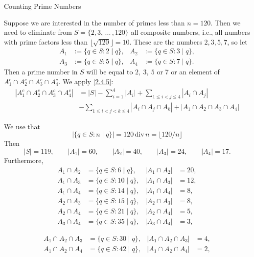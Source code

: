 \documentclass[smaller,hyperref={CJKbookmarks=true}]{beamer}
\begin{document}
\begin{frame}{Counting Prime Numbers}
\begin{spacing}{1.05}
Suppose we are interested in the number of primes less than $n = 120$.
Then we need to eliminate from $S=\{2,3,\,...\,,120\}$ all composite numbers, i.e., all numbers with prime factors less than $\lfloor\sqrt{120}\rfloor=10$. These are the numbers $2,3,5,7$, so let
\begin{align*}
  A_1 &:=\{q\in S:2\mid q\}, & A_2 &:=\{q\in S:3\mid q\}, \\
  A_3 &:=\{q\in S:5\mid q\}, & A_4 &:=\{q\in S:7\mid q\}.
\end{align*}
Then a prime number in $S$ will be equal to $2,\:3,\:5$ or 7 or an element of $A_1^c\cap A_2^c\cap A_3^c\cap A_4^c$. We apply \eqref{2.4.5}:
\begin{equation}\label{2.4.6}
  \begin{split}
     |A_1^c\cap A_2^c\cap A_3^c\cap A_4^c| &=|S|-\sum_{i=1}^{4}|A_i|+\sum_{1\leq i<j\leq 4}|A_i\cap A_j| \\
       &-\sum_{1\leq i<j<k\leq 4}|A_i\cap A_j\cap A_k|+|A_1\cap A_2\cap A_3\cap A_4|
  \end{split}
\end{equation}
\end{spacing}
\newpage
\begin{spacing}{1}
We use that
\[|\{q\in S:n\mid q\}|=120\,\text{div}\,n=\lfloor 120/n\rfloor\]
Then
\[|S|=119,\qquad |A_1|=60,\qquad |A_2|=40,\qquad |A_3|=24,\qquad
|A_4|=17.\]
Furthermore,
\begin{align*}
  A_1\cap A_2 &=\{q\in S:6\mid q\}, & |A_1\cap A_2| &=20, \\
  A_1\cap A_3 &=\{q\in S:10\mid q\}, & |A_1\cap A_3| &=12, \\
  A_1\cap A_4 &=\{q\in S:14\mid q\}, & |A_1\cap A_4| &=8, \\
  A_2\cap A_3 &=\{q\in S:15\mid q\}, & |A_2\cap A_3| &=8, \\
  A_2\cap A_4 &=\{q\in S:21\mid q\}, & |A_2\cap A_4| &=5, \\
  A_3\cap A_4 &=\{q\in S:35\mid q\}, & |A_3\cap A_4| &=3,
\end{align*}
\end{spacing}
\newpage
\begin{spacing}{0.8}
\begin{align*}
  A_1\cap A_2\cap A_3 &=\{q\in S:30\mid q\}, & |A_1\cap A_2\cap A_3| &=4,\\
  A_1\cap A_2\cap A_4 &=\{q\in S:42\mid q\}, & |A_1\cap A_2\cap A_4| &=2,\\

\end{align*}
\end{spacing}
\end{frame}
\end{document}
